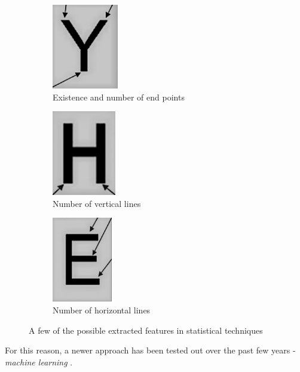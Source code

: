 \begin{figure}[H]
\begin{subfigure}{0.30\textwidth}
\includegraphics[height=10em]{img/characterClassification/statis_endPoint.jpg}
\caption{Existence and number of end points} \label{fig:1b}
\end{subfigure}
\hspace*{\fill} %
\begin{subfigure}{0.30\textwidth}
\includegraphics[height=10em]{img/characterClassification/statis_vertical.jpg}
\caption{Number of vertical lines} \label{fig:1c}
\end{subfigure}
\hspace*{\fill} %
\begin{subfigure}{0.30\textwidth}
\includegraphics[height=10em]{img/characterClassification/statis_horizontal.jpg}
\caption{Number of horizontal lines} \label{fig:1c}
\end{subfigure}
\caption{A few of the possible extracted features in statistical techniques \citep{vithlani2015structural}} \label{fig:1}
\end{figure}

For this reason, a newer approach has been tested out over the past few years - \emph{machine learning} \citep{characterClassification}.

